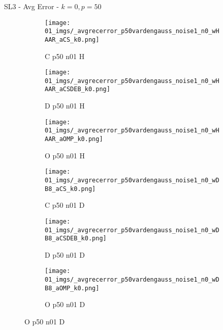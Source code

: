 \begin{frame}{SL3 - Avg Error - $k=0,p=50$}{}
\begin{figure}
\begin{subfigure}{0.13\textwidth}
\texttt{[image: 01\_imgs/\_avgrecerror\_p50vardengauss\_noise1\_n0\_wHAAR\_aCS\_k0.png]}
\caption*{\tiny C p50 n01 H}
\end{subfigure}
\begin{subfigure}{0.13\textwidth}
\texttt{[image: 01\_imgs/\_avgrecerror\_p50vardengauss\_noise1\_n0\_wHAAR\_aCSDEB\_k0.png]}
\caption*{\tiny D p50 n01 H}
\end{subfigure}
\begin{subfigure}{0.13\textwidth}
\texttt{[image: 01\_imgs/\_avgrecerror\_p50vardengauss\_noise1\_n0\_wHAAR\_aOMP\_k0.png]}
\caption*{\tiny O p50 n01 H}
\end{subfigure}
\begin{subfigure}{0.13\textwidth}
\texttt{[image: 01\_imgs/\_avgrecerror\_p50vardengauss\_noise1\_n0\_wDB8\_aCS\_k0.png]}
\caption*{\tiny C p50 n01 D}
\end{subfigure}
\begin{subfigure}{0.13\textwidth}
\texttt{[image: 01\_imgs/\_avgrecerror\_p50vardengauss\_noise1\_n0\_wDB8\_aCSDEB\_k0.png]}
\caption*{\tiny D p50 n01 D}
\end{subfigure}
\begin{subfigure}{0.13\textwidth}
\texttt{[image: 01\_imgs/\_avgrecerror\_p50vardengauss\_noise1\_n0\_wDB8\_aOMP\_k0.png]}
\caption*{\tiny O p50 n01 D}
\end{subfigure}

\vspace{5pt}


\end{figure}
\end{frame}
